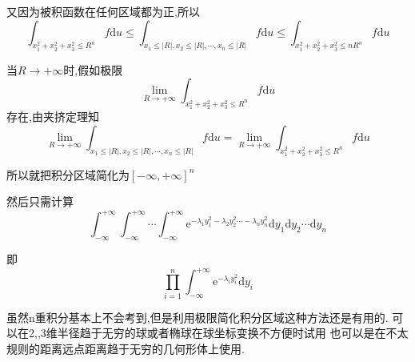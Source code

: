 \documentclass{ctexart}
\begin{document}
又因为被积函数在任何区域都为正,所以$$\int_{x_{1}^{2}+x_{2}^{2}+x_{3}^{2}\leq R^{n}}f\mathrm{d}u\leq\int_{x_{1}\leq |R|,x_{2}\leq |R|,\cdots,x_{n}\leq |R|}f\mathrm{d}u\leq\int_{x_{1}^{2}+x_{2}^{2}+x_{3}^{2}\leq nR^{n}}f\mathrm{d}u$$

当$R\rightarrow +\infty$时,假如极限$$\lim_{R\rightarrow +\infty}\int_{x_{1}^{2}+x_{2}^{2}+x_{3}^{2}\leq R^{n}}f\mathrm{d}u$$存在,由夹挤定理知$$\lim_{R\rightarrow +\infty}\int_{x_{1}\leq |R|,x_{2}\leq |R|,\cdots,x_{n}\leq |R|}f\mathrm{d}u=\lim_{R\rightarrow +\infty}\int_{x_{1}^{2}+x_{2}^{2}+x_{3}^{2}\leq R^{n}}f\mathrm{d}u$$

所以就把积分区域简化为$[-\infty,+\infty]^{n}$

然后只需计算$$\int^{+\infty}_{-\infty}\int^{+\infty}_{-\infty}\cdots\int^{+\infty}_{-\infty}
\mathrm{e}^{-\lambda_{1}y_{1}^{2}-\lambda_{2}y_{2}^{2}\cdots-\lambda_{n}y_{n}^{2}}\mathrm{d}y_{1}\mathrm{d}y_{2}\cdots\mathrm{d}y_{n}$$

即$$\prod_{i=1}^{n}\int^{+\infty}_{-\infty}\mathrm{e}^{-\lambda_{i}y_{i}^{2}}\mathrm{d}y_{i}$$



虽然n重积分基本上不会考到,但是利用极限简化积分区域这种方法还是有用的.
可以在2,,3维半径趋于无穷的球或者椭球在球坐标变换不方便时试用
也可以是在不太规则的距离远点距离趋于无穷的几何形体上使用.
\end{document}
